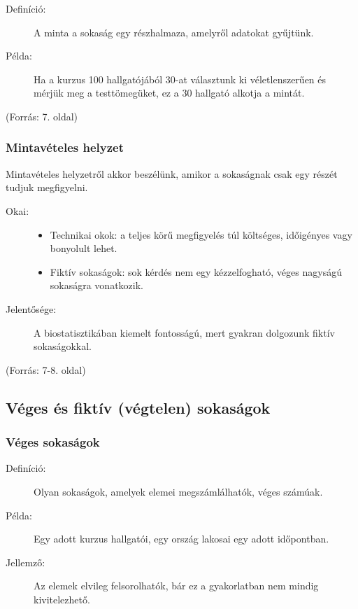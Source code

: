 \documentclass[a4paper,12pt]{article}
\begin{document}
    \begin{description}
        \item[Definíció:] A minta a sokaság egy részhalmaza, amelyről adatokat gyűjtünk.
        \item[Példa:] Ha a kurzus 100 hallgatójából 30-at választunk ki véletlenszerűen és mérjük meg a testtömegüket, ez a 30 hallgató alkotja a mintát.
    \end{description}

    (Forrás: 7. oldal)

    \subsubsection{Mintavételes helyzet}

    Mintavételes helyzetről akkor beszélünk, amikor a sokaságnak csak egy részét tudjuk megfigyelni.

    \begin{description}
        \item[Okai:]
        \begin{itemize}
            \item Technikai okok: a teljes körű megfigyelés túl költséges, időigényes vagy bonyolult lehet.
            \item Fiktív sokaságok: sok kérdés nem egy kézzelfogható, véges nagyságú sokaságra vonatkozik.
        \end{itemize}
        \item[Jelentősége:] A biostatisztikában kiemelt fontosságú, mert gyakran dolgozunk fiktív sokaságokkal.
    \end{description}

    (Forrás: 7-8. oldal)

    \subsection{Véges és fiktív (végtelen) sokaságok}

    \subsubsection{Véges sokaságok}

    \begin{description}
        \item[Definíció:] Olyan sokaságok, amelyek elemei megszámlálhatók, véges számúak.
        \item[Példa:] Egy adott kurzus hallgatói, egy ország lakosai egy adott időpontban.
        \item[Jellemző:] Az elemek elvileg felsorolhatók, bár ez a gyakorlatban nem mindig kivitelezhető.
    \end{description}
\end{document}

